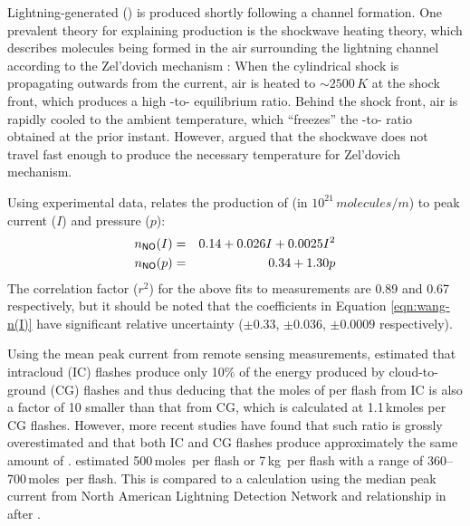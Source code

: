 	Lightning-generated  ({\lnox}) is produced shortly following a channel formation. One prevalent theory for explaining {\lnox} production is the shockwave heating theory, which describes  molecules being formed in the air surrounding the lightning channel according to the Zel'dovich mechanism \citep[][and references therein]{Zeldovich:1966vn,Borucki:1984dq}: When the cylindrical shock is propagating outwards from the current, air is heated to $\sim2500\,\unit{K}$ at the shock front, which produces a high -to- equilibrium ratio. Behind the shock front, air is rapidly cooled to the ambient temperature, which ``freezes'' the -to- ratio obtained at the prior instant. However, \citet{Stark:1996bh} argued that the shockwave does not travel fast enough to produce the necessary temperature for Zel'dovich mechanism.
	
	Using experimental data, \citet{Wang:1998ve} relates the production of  (in $10^{21}\,\unit{molecules/m}$) to peak current ($I$) and pressure ($p$):
	\begin{eqnarray}
		n_{\chem{NO}}(I) &=& 0.14 + 0.026I + 0.0025I^2 \label{eqn:wang-n(I)} \\
		n_{\chem{NO}}(p) &=& 0.34 + 1.30 p \label{eqn:wang-n(p)}
	\end{eqnarray}
	The correlation factor ($r^2$) for the above fits to measurements are 0.89 and 0.67 respectively, but it should be noted that the coefficients in Equation \ref{eqn:wang-n(I)} have significant relative uncertainty ($\pm0.33$, $\pm0.036$, $\pm0.0009$ respectively).
	
	Using the mean peak current from remote sensing measurements, \citet{Price:1997fk} estimated that intracloud (IC) flashes produce only 10\% of the energy produced by cloud-to-ground (CG) flashes and thus deducing that the moles of  per flash from IC is also a factor of 10 smaller than that from CG, which is calculated at 1.1\,\unit{kmoles} per CG flashes. However, more recent studies have found that such ratio is grossly overestimated and that both IC and CG flashes produce approximately the same amount of . \citet{Ott:2010lo} estimated 500\,\unit{moles}\, per flash or 7\,\unit{kg}\, per flash with a range of 360--700\,\unit{moles}\, per flash. This is compared to a calculation using the median peak current from North American Lightning Detection Network \citep[NALDN;][]{Orville:2002uq} and relationship in \citet{Decaria:2000kl} after \citet{Wang:1998ve}.
	
